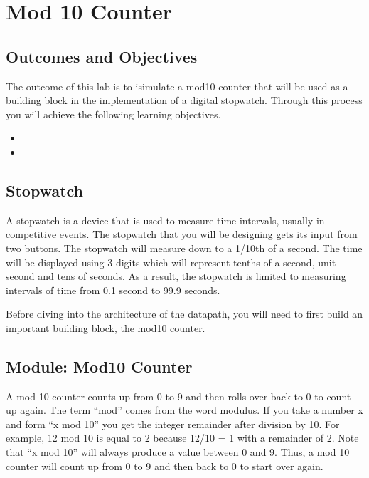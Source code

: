 \chapter{Mod 10 Counter}
\label{chapter:mod10}
\graphicspath{ {./Lab08Mod10Counter/Fig} }


\section{Outcomes and Objectives}

The outcome of this lab is to isimulate a mod10 counter
that will be used as a building block in the implementation 
of a digital stopwatch.
Through this process you will achieve the following
learning objectives.
\begin{itemize}
	\item {}
	\item {}
\end{itemize}



\section{Stopwatch}

A stopwatch is a device that is used to measure time intervals, usually
in competitive events. The stopwatch that you will be designing gets its
input from two buttons. The stopwatch will measure down to a 1/10th of a
second. The time will be displayed using 3 digits which will represent
tenths of a second, unit second and tens of seconds. As a result, the
stopwatch is limited to measuring intervals of time from 0.1 second to
99.9 seconds.

Before diving into the architecture of the datapath, you will need to
first build an important building block, the mod10 counter.

\section{Module: Mod10 Counter}

A mod 10 counter counts up from 0 to 9 and then rolls over back to 0 to
count up again. The term ``mod'' comes from the word modulus. If you
take a number x and form ``x mod 10'' you get the integer remainder
after division by 10. For example, 12 mod 10 is equal to 2 because 12/10
= 1 with a remainder of 2. Note that ``x mod 10'' will always produce a
value between 0 and 9. Thus, a mod 10 counter will count up from 0 to 9
and then back to 0 to start over again.

